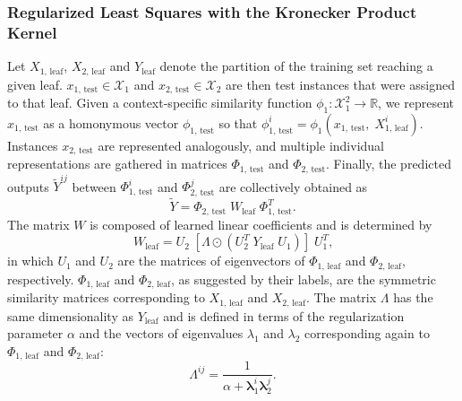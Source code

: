 \documentclass[sn-mathphys-num]{sn-jnl}%
\newcommand{\T}{^T}
\theoremstyle{thmstyleone}%
\theoremstyle{thmstyletwo}%
\theoremstyle{thmstylethree}%
\begin{document}
\subsubsection{Regularized Least Squares with the Kronecker Product Kernel}
\label{sec:rlskron leaf}

Let $X_\text{1, leaf}$, $X_\text{2, leaf}$ and $Y_\text{leaf}$ denote the partition of the training set reaching a given leaf.
$x_\text{1, test} \in \mathcal{X}_1$ and $x_\text{2, test} \in \mathcal{X}_2$ are then test instances that were assigned to that leaf.
Given a context-specific similarity function $\phi_1: \mathcal{X}_1^2 \to \mathbb{R}$, we represent $x_\text{1, test}$ as a homonymous vector $\phi_\text{1, test}$ so that $\phi^i_\text{1, test} = \phi_1(x_\text{1, test},\; X^i_\text{1, leaf})$. 
Instances $x_\text{2, test}$ are represented analogously, and multiple individual representations are gathered in matrices $\Phi_\text{1, test}$ and $\Phi_\text{2, test}$.
%
Finally, the predicted outputs $\tilde Y^{ij}$ between $\Phi^i_\text{1, test}$ and $\Phi^j_\text{2, test}$ are collectively obtained as
\begin{equation}
    \label{eq:rlskron output}
    \tilde Y = \Phi_\text{2, test} \; W_\text{leaf} \;\Phi\T_\text{1, test}
    \text{.}
\end{equation}
The matrix $W$ is composed of learned linear coefficients and is determined by
\begin{equation}
    \label{eq:rlskron w}
    W_\text{leaf} = U_2
    \;[
        \Lambda
        \odot (U_2\T \; Y_\text{leaf} \; U_1)
    ]\;
    U_1\T
    \text{,}
\end{equation}
%
in which $U_1$ and $U_2$ are the matrices of eigenvectors of $\Phi_\text{1, leaf}$ and $\Phi_\text{2, leaf}$, respectively. $\Phi_\text{1, leaf}$ and $\Phi_\text{2, leaf}$, as suggested by their labels, are the symmetric similarity matrices corresponding to $X_\text{1, leaf}$ and $X_\text{2, leaf}$. The matrix $\Lambda$ has the same dimensionality as $Y_\text{leaf}$ and is defined in terms of the regularization parameter $\alpha$ and the vectors of eigenvalues $\lambda_1$ and $\lambda_2$ corresponding again to $\Phi_\text{1, leaf}$ and $\Phi_\text{2, leaf}$:
%
\begin{equation}
     \Lambda^{ij} = \frac{1}{\alpha + \mathbf{\lambda}_1^i \mathbf{\lambda}_2^{j}}
     \text{.}
\end{equation}
\end{document}
